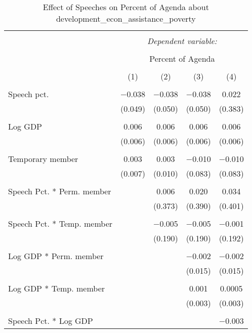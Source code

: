 
\begin{table}[!htbp] \centering 
  \caption{Effect of Speeches on Percent of Agenda about  development_econ_assistance_poverty} 
  \label{} 
\begin{tabular}{@{\extracolsep{5pt}}lcccc} 
\\[-1.8ex]\hline 
\hline \\[-1.8ex] 
 & \multicolumn{4}{c}{\textit{Dependent variable:}} \\ 
\cline{2-5} 
\\[-1.8ex] & \multicolumn{4}{c}{Percent of Agenda} \\ 
\\[-1.8ex] & (1) & (2) & (3) & (4)\\ 
\hline \\[-1.8ex] 
 Speech pct. & $-$0.038 & $-$0.038 & $-$0.038 & 0.022 \\ 
  & (0.049) & (0.050) & (0.050) & (0.383) \\ 
  & & & & \\ 
 Log GDP & 0.006 & 0.006 & 0.006 & 0.006 \\ 
  & (0.006) & (0.006) & (0.006) & (0.006) \\ 
  & & & & \\ 
 Temporary member & 0.003 & 0.003 & $-$0.010 & $-$0.010 \\ 
  & (0.007) & (0.010) & (0.083) & (0.083) \\ 
  & & & & \\ 
 Speech Pct. * Perm. member &  & 0.006 & 0.020 & 0.034 \\ 
  &  & (0.373) & (0.390) & (0.401) \\ 
  & & & & \\ 
 Speech Pct. * Temp. member &  & $-$0.005 & $-$0.005 & $-$0.001 \\ 
  &  & (0.190) & (0.190) & (0.192) \\ 
  & & & & \\ 
 Log GDP * Perm. member &  &  & $-$0.002 & $-$0.002 \\ 
  &  &  & (0.015) & (0.015) \\ 
  & & & & \\ 
 Log GDP * Temp. member &  &  & 0.001 & 0.0005 \\ 
  &  &  & (0.003) & (0.003) \\ 
  & & & & \\ 
 Speech Pct. * Log GDP &  &  &  & $-$0.003 \\ 

\end{tabular}
\end{table}
